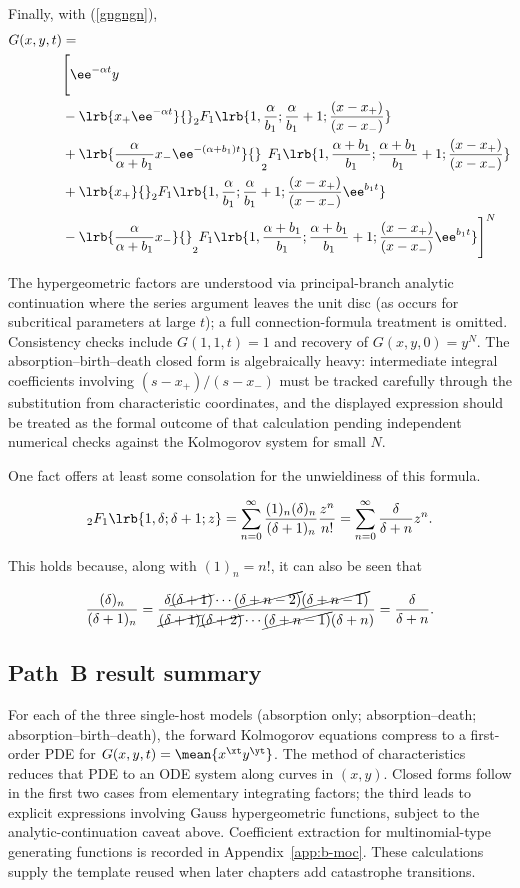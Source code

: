 \noindent
Finally, with (\ref{gngngn}),
\begin{align*}
G(x,y,t) &=\\
 &\Bigg[\ee^{-\alpha t }y\\
 &- \lrb{x_+ \ee^{-\alpha t}}{}_2 F_1 \lrb{1,\frac{\alpha}{b_1 };\frac{\alpha}{b_1 }+1; \frac{(x-x_+)}{(x-x_-)}}\\
&+\lrb{\frac{\alpha  }{\alpha + b_1}x_-\ee^{-(\alpha + b_1)t}}{}_2F_1\lrb{1,\frac{\alpha + b_1 }{b_1 };\frac{\alpha + b_1 }{b_1 }+1; \frac{(x-x_+)}{(x-x_-)}}\\
&+ \lrb{x_+}{}_2 F_1 \lrb{1,\frac{\alpha}{b_1 };\frac{\alpha}{b_1 }+1; \frac{(x-x_+)}{(x-x_-)}\ee^{b_1  t}}\\
&- \lrb{\frac{\alpha  }{\alpha + b_1}x_-}{}_2F_1\lrb{1,\frac{\alpha + b_1 }{b_1 };\frac{\alpha + b_1 }{b_1 }+1; \frac{(x-x_+)}{(x-x_-)}\ee^{b_1  t}}\Bigg]^N
\end{align*}


The hypergeometric factors are understood via principal-branch analytic continuation where the series argument leaves the unit disc (as occurs for subcritical parameters at large $t$); a full connection-formula treatment is omitted. Consistency checks include $G(1,1,t)=1$ and recovery of $G(x,y,0)=y^N$. The absorption--birth--death closed form is algebraically heavy: intermediate integral coefficients involving $(s-x_+)/(s-x_-)$ must be tracked carefully through the substitution from characteristic coordinates, and the displayed expression should be treated as the formal outcome of that calculation pending independent numerical checks against the Kolmogorov system for small $N$.

One fact offers at least some consolation for the unwieldiness of this formula.

$${}_2F_1\lrb{1,\delta;\delta+1;z} = \sum^\infty_{n=0}\frac{(1)_n(\delta)_n}{(\delta+1)_n}\frac{z^n}{n!} = \sum^\infty_{n=0}\frac{\delta}{\delta+n}{z^n}. $$

This holds because, along with $(1)_n = n!$, it can also be seen that

$$\frac{(\delta)_n}{(\delta+1)_n} = \frac{\delta\cancel{(\delta+1)}\cdots\cancel{(\delta + n-2)}\cancel{(\delta + n-1)}}{\cancel{(\delta+1)}\cancel{(\delta+2)}\cdots\cancel{(\delta + n-1)}(\delta + n)} = \frac{\delta}{\delta+n}.$$

\subsection*{Path~B result summary}
\label{sec:moc-summary}
For each of the three single-host models (absorption only; absorption--death; absorption--birth--death), the forward Kolmogorov equations compress to a first-order PDE for $G(x,y,t)=\mean{x^{\xt}y^{\yt}}$. The method of characteristics reduces that PDE to an ODE system along curves in $(x,y)$. Closed forms follow in the first two cases from elementary integrating factors; the third leads to explicit expressions involving Gauss hypergeometric functions, subject to the analytic-continuation caveat above. Coefficient extraction for multinomial-type generating functions is recorded in Appendix~\ref{app:b-moc}. These calculations supply the template reused when later chapters add catastrophe transitions.
